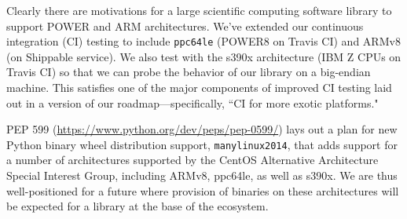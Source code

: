 Clearly there are motivations for a large scientific computing
software library to support POWER and ARM architectures. We've extended
our continuous integration (CI) testing to include \texttt{ppc64le}
(POWER8 on Travis CI) and ARMv8 (on Shippable service). We also test
with the s390x architecture (IBM Z CPUs on Travis CI) so that we
can probe the behavior of our library on a big-endian machine.
This satisfies one of the major components of
improved CI testing laid out in a version of our
roadmap---specifically, ``CI for more exotic
platforms."

PEP 599 (\url{https://www.python.org/dev/peps/pep-0599/})
lays out a plan for new Python binary wheel
distribution support, \texttt{manylinux2014}, that adds
support for a number of architectures supported by the CentOS
Alternative Architecture Special Interest Group, including
ARMv8, ppc64le, as well as s390x. We are thus well-positioned
for a future where provision of binaries on these architectures
will be expected for a library at the base of the ecosystem.
